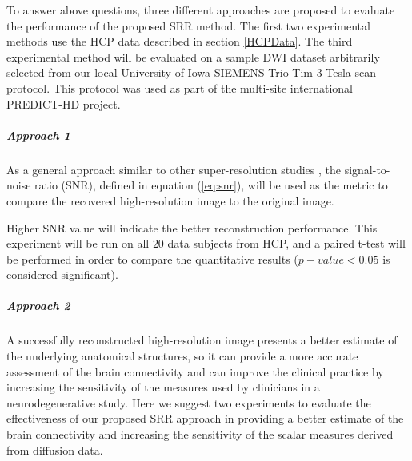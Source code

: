 To answer above questions, three different approaches are proposed to evaluate the performance of the proposed SRR method.
The first two experimental methods use the HCP data described in section \ref{HCPData}. The third experimental method will be evaluated on a sample DWI dataset arbitrarily selected from our local University of Iowa
SIEMENS Trio Tim $3$ Tesla scan protocol. This protocol was used as part of the multi-site international PREDICT-HD \cite{PREDICTHD} project.

\subparagraph*{Approach 1}

As a general approach similar to other super-resolution studies \cite{brown2014,shi2015,ongie2015}, the signal-to-noise ratio (SNR), defined in equation (\ref{eq:snr}), will be used as the metric to compare the recovered high-resolution image to the original image.

Higher SNR value will indicate the better reconstruction performance.
This experiment will be run on all $20$ data subjects from HCP, and a paired t-test will be performed in order to compare the quantitative results ($p-value < 0.05$ is considered significant).

\subparagraph*{Approach 2}

A successfully reconstructed high-resolution image presents a better estimate of the underlying anatomical structures, so it can provide a more accurate assessment of the brain connectivity and can improve the clinical practice by increasing the sensitivity of the measures used by clinicians in a neurodegenerative study.
Here we suggest two experiments to evaluate the effectiveness of our proposed SRR approach in providing a better estimate of the brain connectivity and increasing the sensitivity of the scalar measures derived from diffusion data.

